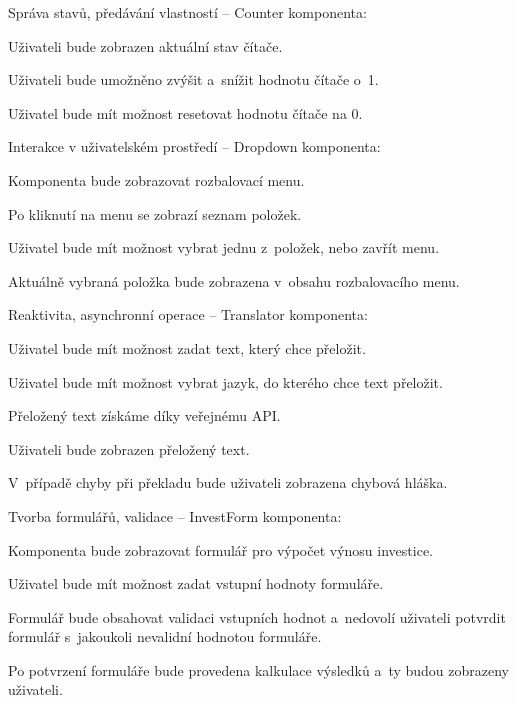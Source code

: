 \begin{citemize}
	\item Správa stavů, předávání vlastností -- Counter komponenta:
	
	\begin{cenumerate}
		\item Uživateli bude zobrazen aktuální stav čítače.
		\item Uživateli bude umožněno zvýšit a~snížit hodnotu čítače o~1.
		\item Uživatel bude mít možnost resetovat hodnotu čítače na 0.
	\end{cenumerate}

	\item Interakce v uživatelském prostředí -- Dropdown komponenta:
	
	\begin{cenumerate}
		\item Komponenta bude zobrazovat rozbalovací menu.
		\item Po kliknutí na menu se zobrazí seznam položek.
		\item Uživatel bude mít možnost vybrat jednu z~položek, nebo zavřít menu.
		\item Aktuálně vybraná položka bude zobrazena v~obsahu rozbalovacího menu.
	\end{cenumerate}

	\item Reaktivita, asynchronní operace -- Translator komponenta:
	
	\begin{cenumerate}
		\item Uživatel bude mít možnost zadat text, který chce přeložit.
		\item Uživatel bude mít možnost vybrat jazyk, do kterého chce text přeložit.
		\item Přeložený text získáme díky veřejnému API.
		\item Uživateli bude zobrazen přeložený text.
		\item V~případě chyby při překladu bude uživateli zobrazena chybová hláška.
	\end{cenumerate}

	\item Tvorba formulářů, validace -- InvestForm komponenta:
	
	\begin{cenumerate}
		\item Komponenta bude zobrazovat formulář pro výpočet výnosu investice.
		\item Uživatel bude mít možnost zadat vstupní hodnoty formuláře.
		\item Formulář bude obsahovat validaci vstupních hodnot a~nedovolí uživateli potvrdit formulář s~jakoukoli nevalidní hodnotou formuláře.
		\item Po potvrzení formuláře bude provedena kalkulace výsledků a~ty budou zobrazeny uživateli.
	\end{cenumerate}


\end{citemize}
